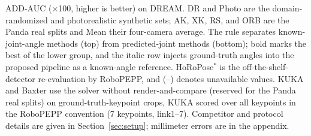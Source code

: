 \begin{table}[t!]
{}
\caption{ADD-AUC ($\times$100, higher is better) on DREAM. DR and Photo are the domain-randomized and photorealistic synthetic sets; AK, XK, RS, and ORB are the Panda real splits and Mean their four-camera average. The rule separates known-joint-angle methods (top) from predicted-joint methods (bottom); bold marks the best of the lower group, and the italic row injects ground-truth angles into the proposed pipeline as a known-angle reference. HoRoPose$^{*}$ is the off-the-shelf-detector re-evaluation by RoboPEPP, and (--) denotes unavailable values. KUKA and Baxter use the solver without render-and-compare (reserved for the Panda real splits) on ground-truth-keypoint crops, KUKA scored over all keypoints in the RoboPEPP convention (7 keypoints, link1--7). Competitor and protocol details are given in Section~\ref{sec:setup}; millimeter errors are in the appendix.}
\label{tab:main}
\end{table}

